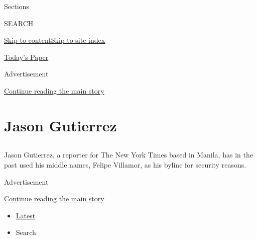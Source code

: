 Sections

SEARCH

\protect\hyperlink{site-content}{Skip to
content}\protect\hyperlink{site-index}{Skip to site index}

\href{https://myaccount.nytimes.com/auth/login?response_type=cookie\&client_id=vi}{}

\href{https://www.nytimes.com/section/todayspaper}{Today's Paper}

Advertisement

\protect\hyperlink{after-top}{Continue reading the main story}

\hypertarget{jason-gutierrez}{%
\section{Jason Gutierrez}\label{jason-gutierrez}}

\subsection{}

Jason Gutierrez, a reporter for The New York Times based in Manila, has
in the past used his middle names, Felipe Villamor, as his byline for
security reasons.

Advertisement

\protect\hyperlink{after-mid1}{Continue reading the main story}

\begin{itemize}
\tightlist
\item
  \protect\hyperlink{stream-panel}{Latest}
\item
  Search
\end{itemize}

